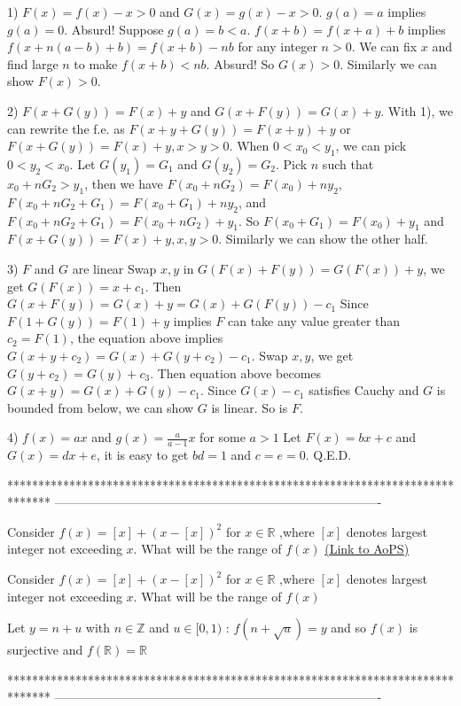 \begin{solution}
	1) $F(x)=f(x)-x>0$ and $G(x)=g(x)-x>0$.
$g(a)=a$ implies $g(a)=0$. Absurd!
Suppose $g(a)=b<a$. $f(x+b)=f(x+a)+b$ implies $f(x+n(a-b)+b)=f(x+b)-nb$ for any integer $n>0$. We can fix $x$ and find large $n$ to make $f(x+b)<nb$. Absurd! So $G(x)>0$. Similarly we can show $F(x)>0$.

2) $F(x+G(y))=F(x)+y$ and $G(x+F(y))=G(x)+y$.
With 1), we can rewrite the f.e. as $F(x+y+G(y))=F(x+y)+y$ or $F(x+G(y))=F(x)+y,x>y>0$. 
When $0<x_0<y_1$, we can pick $0<y_2<x_0$. Let $G(y_1)=G_1$ and $G(y_2)=G_2$.
Pick $n$ such that $x_0+nG_2>y_1$, then we have
$F(x_0+nG_2)=F(x_0)+ny_2$, 
$F(x_0+nG_2+G_1)=F(x_0+G_1)+ny_2$, and
$F(x_0+nG_2+G_1)=F(x_0+nG_2)+y_1$.
So $F(x_0+G_1)=F(x_0)+y_1$ and $F(x+G(y))=F(x)+y,x,y>0$. Similarly we can show the other half.

3) $F$ and $G$ are linear
Swap $x,y$ in $G(F(x)+F(y))=G(F(x))+y$, we get $G(F(x))=x+c_1$.
Then $G(x+F(y))=G(x)+y=G(x)+G(F(y))-c_1$ 
Since $F(1+G(y))=F(1)+y$ implies $F$ can take any value greater than $c_2=F(1)$, the equation above implies
$G(x+y+c_2)=G(x)+G(y+c_2)-c_1$.
Swap $x,y$, we get $G(y+c_2)=G(y)+c_3$. Then equation above becomes $G(x+y)=G(x)+G(y)-c_1$.
Since $G(x)-c_1$ satisfies Cauchy and $G$ is bounded from below, we can show $G$ is linear. So is $F$.

4) $f(x)=ax$ and $g(x)=\frac{a}{a-1}x$ for some $a>1$
Let $F(x)=bx+c$ and $G(x)=dx+e$, it is easy to get $bd=1$ and $c=e=0$.
Q.E.D.
\end{solution}
*******************************************************************************
-------------------------------------------------------------------------------

\begin{problem}
	Consider $f(x)=[x]+(x-[x])^2$ for $x\in \mathbb{R}$ ,where $[x]$ denotes largest integer not exceeding $x$.
What will be the range of $f(x)$
	\flushright \href{https://artofproblemsolving.com/community/c6h546808}{(Link to AoPS)}
\end{problem}



\begin{solution}
	\begin{tcolorbox}Consider $f(x)=[x]+(x-[x])^2$ for $x\in \mathbb{R}$ ,where $[x]$ denotes largest integer not exceeding $x$.
What will be the range of $f(x)$\end{tcolorbox}

Let $y=n+u$ with $n\in\mathbb Z$ and $u\in[0,1)$ : $f(n+\sqrt u)=y$ and so $f(x)$ is surjective and $\boxed{f(\mathbb R)=\mathbb R}$
\end{solution}
*******************************************************************************
-------------------------------------------------------------------------------

